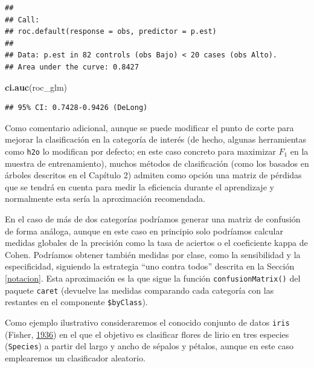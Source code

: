 \documentclass[
  spanish,
]{book}
\newenvironment{Shaded}{\begin{snugshade}}{\end{snugshade}}
\newcommand{\KeywordTok}[1]{\textcolor[rgb]{0.13,0.29,0.53}{\textbf{#1}}}
\newcommand{\NormalTok}[1]{#1}
\theoremstyle{break}
\theoremstyle{definition}
\theoremstyle{definition}
\theoremstyle{definition}
\theoremstyle{remark}
\begin{document}
\begin{verbatim}
## 
## Call:
## roc.default(response = obs, predictor = p.est)
## 
## Data: p.est in 82 controls (obs Bajo) < 20 cases (obs Alto).
## Area under the curve: 0.8427
\end{verbatim}

\begin{Shaded}
\begin{Highlighting}[]
\KeywordTok{ci.auc}\NormalTok{(roc_glm)}
\end{Highlighting}
\end{Shaded}

\begin{verbatim}
## 95% CI: 0.7428-0.9426 (DeLong)
\end{verbatim}

Como comentario adicional, aunque se puede modificar el punto de corte para mejorar la clasificación en la categoría de interés (de hecho, algunas herramientas como \texttt{h2o} lo modifican por defecto; en este caso concreto para maximizar \(F_1\) en la muestra de entrenamiento), muchos métodos de clasificación (como los basados en árboles descritos en el Capítulo 2) admiten como opción una matriz de pérdidas que se tendrá en cuenta para medir la eficiencia durante el aprendizaje y normalmente esta sería la aproximación recomendada.

En el caso de más de dos categorías podríamos generar una matriz de confusión de forma análoga,
aunque en este caso en principio solo podríamos calcular medidas globales de la precisión como la tasa de aciertos o el coeficiente kappa de Cohen.
Podríamos obtener también medidas por clase, como la sensibilidad y la especificidad, siguiendo la estrategia ``uno contra todos'' descrita en la Sección \ref{notacion}.
Esta aproximación es la que sigue la función \texttt{confusionMatrix()} del paquete \texttt{caret} (devuelve las medidas comparando cada categoría con las restantes en el componente \texttt{\$byClass}).

Como ejemplo ilustrativo consideraremos el conocido conjunto de datos \texttt{iris} (Fisher, \protect\hyperlink{ref-fisher1936use}{1936}) en el que el objetivo es clasificar flores de lirio en tres especies (\texttt{Species}) a partir del largo y ancho de sépalos y pétalos, aunque en este caso emplearemos un clasificador aleatorio.
\end{document}
